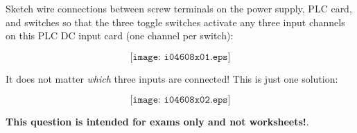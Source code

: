 

Sketch wire connections between screw terminals on the power supply, PLC card, and switches so that the three toggle switches activate any three input channels on this PLC DC input card (one channel per switch):

$$\texttt{[image: i04608x01.eps]}$$







It does not matter {\it which} three inputs are connected!  This is just one solution:

$$\texttt{[image: i04608x02.eps]}$$







{\bf This question is intended for exams only and not worksheets!}.


